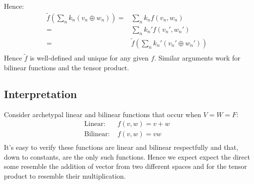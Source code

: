 Hence:
\begin{equation*}
\begin{aligned}
	\tilde{f}\left(\sum_nk_n(v_n\oplus w_n)\right) =& \sum_nk_nf(v_n,w_n)\\
	=& \sum_nk_n'f(v_n',w_n')\\
	=&\tilde{f}\left(\sum_nk_n'(v_n'\oplus w_n')\right) \\
\end{aligned}
\end{equation*}
Hence $\tilde{f}$ is well-defined and unique for any given $f$.
Similar arguments work for bilinear functions and the tensor product.

\subsection{Interpretation}
Consider archetypal linear and bilinear functions that occur when $V=W=F$:
\begin{equation*}
\begin{aligned}
	\text{Linear: }&f(v,w) = v+w\\
	\text{Bilinear: }&f(v,w) = vw\\
\end{aligned}
\end{equation*}
It's easy to verify these functions are linear and bilinear respectfully and that,
down to constants,
are the only such functions.
Hence we expect expect the direct some resemble the addition of vector from two different spaces and for the tensor product to resemble their multiplication.
